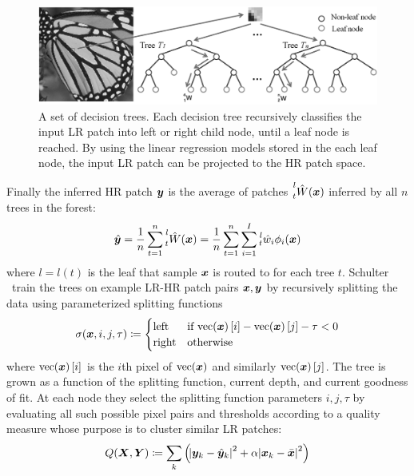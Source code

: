\begin{figure}
    \centering
    \includegraphics[width=\linewidth,keepaspectratio]{figures/classical/FIRF.png}
    \caption{A set of decision trees. Each decision tree recursively classifies the input LR patch into left or right child node, until a leaf node is reached. By using the linear regression models stored in the each leaf node, the input LR patch can be projected to the HR patch space\cite{Huang}.}
    \label{fig:firf}
\end{figure}
%
Finally the inferred HR patch \(\bm{y}\) is the average of patches \(\prescript{l}{t}{\hat{W}(\bm{x})}\) inferred by all \(n\) trees in the forest:
\begin{equation}
    \hat{\bm{y}} = \frac{1}{n} \sum_{t=1}^{n} \prescript{l}{t}{\hat{W}(\bm{x})} =  \frac{1}{n} \sum_{t=1}^{n} \sum_{i=1}^I \prescript{l}{t}{\hat{w}_i}\phi_i(\bm{x})
\end{equation}
where \(l = l(t)\) is the leaf that sample \(\bm{x}\) is routed to for each tree \(t\).
%
Schulter \etal~train the trees on example LR-HR patch pairs \(\bm{x}, \bm{y}\) by recursively splitting the data using parameterized splitting functions
\begin{equation}
    \sigma(\bm{x}, i, j, \tau)\coloneqq {
        \begin{cases}
            \text{left}  & \text{if } \text{vec}(\bm{x})\left[ i \right] - \text{vec}(\bm{x})\left[ j \right] - \tau < 0 \\
            \text{right} & \text{otherwise}
        \end{cases}
    }
\end{equation}
where \(\text{vec}(\bm{x})\left[ i \right]\) is the \(i\)th pixel of \(\text{vec}(\bm{x})\) and similarly \(\text{vec}(\bm{x})\left[ j \right]\).
%
The tree is grown as a function of the splitting function, current depth, and current goodness of fit.
%
At each node they select the splitting function parameters \(i, j, \tau\) by evaluating all such possible pixel pairs and thresholds according to a quality measure whose purpose is to cluster similar LR patches:
\begin{equation}
    Q(\bm{X}, \bm{Y}) \coloneqq \sum_k \left( \abs{ \bm{y}_k - \hat{\bm{y}}_k }^2 + \alpha\abs{ \bm{x}_k - \bar{\bm{x}} }^2 \right)
    \label{eqn:qualitymeasure}
\end{equation}
